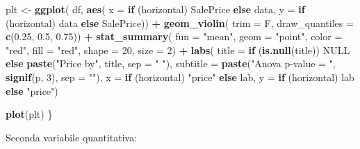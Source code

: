 \documentclass[
]{article}
\newenvironment{Shaded}{\begin{snugshade}}{\end{snugshade}}
\newcommand{\AttributeTok}[1]{\textcolor[rgb]{0.13,0.29,0.53}{#1}}
\newcommand{\ConstantTok}[1]{\textcolor[rgb]{0.56,0.35,0.01}{#1}}
\newcommand{\ControlFlowTok}[1]{\textcolor[rgb]{0.13,0.29,0.53}{\textbf{#1}}}
\newcommand{\DecValTok}[1]{\textcolor[rgb]{0.00,0.00,0.81}{#1}}
\newcommand{\FloatTok}[1]{\textcolor[rgb]{0.00,0.00,0.81}{#1}}
\newcommand{\FunctionTok}[1]{\textcolor[rgb]{0.13,0.29,0.53}{\textbf{#1}}}
\newcommand{\NormalTok}[1]{#1}
\newcommand{\OtherTok}[1]{\textcolor[rgb]{0.56,0.35,0.01}{#1}}
\newcommand{\SpecialCharTok}[1]{\textcolor[rgb]{0.81,0.36,0.00}{\textbf{#1}}}
\newcommand{\StringTok}[1]{\textcolor[rgb]{0.31,0.60,0.02}{#1}}
\begin{document}
\begin{Shaded}
\begin{Highlighting}[]
\NormalTok{    plt }\OtherTok{\textless{}{-}} \FunctionTok{ggplot}\NormalTok{(}
\NormalTok{        df,}
        \FunctionTok{aes}\NormalTok{(}
            \AttributeTok{x =} \ControlFlowTok{if}\NormalTok{ (horizontal) SalePrice }\ControlFlowTok{else}\NormalTok{ data, }
            \AttributeTok{y =} \ControlFlowTok{if}\NormalTok{ (horizontal) data }\ControlFlowTok{else}\NormalTok{ SalePrice)) }\SpecialCharTok{+}
    \FunctionTok{geom\_violin}\NormalTok{(}
        \AttributeTok{trim =}\NormalTok{ F, }
        \AttributeTok{draw\_quantiles =} \FunctionTok{c}\NormalTok{(}\FloatTok{0.25}\NormalTok{, }\FloatTok{0.5}\NormalTok{, }\FloatTok{0.75}\NormalTok{)) }\SpecialCharTok{+}
    \FunctionTok{stat\_summary}\NormalTok{(}
        \AttributeTok{fun =} \StringTok{"mean"}\NormalTok{,}
        \AttributeTok{geom =} \StringTok{"point"}\NormalTok{,}
        \AttributeTok{color =} \StringTok{"red"}\NormalTok{,}
        \AttributeTok{fill =} \StringTok{"red"}\NormalTok{,}
        \AttributeTok{shape =} \DecValTok{20}\NormalTok{,}
        \AttributeTok{size =} \DecValTok{2}\NormalTok{) }\SpecialCharTok{+}
    \FunctionTok{labs}\NormalTok{(}
        \AttributeTok{title =} \ControlFlowTok{if}\NormalTok{ (}\FunctionTok{is.null}\NormalTok{(title)) }\ConstantTok{NULL} \ControlFlowTok{else} \FunctionTok{paste}\NormalTok{(}\StringTok{"Price by"}\NormalTok{, title, }\AttributeTok{sep =} \StringTok{" "}\NormalTok{),}
        \AttributeTok{subtitle =} \FunctionTok{paste}\NormalTok{(}\StringTok{"Anova p{-}value = "}\NormalTok{, }\FunctionTok{signif}\NormalTok{(p, }\DecValTok{3}\NormalTok{), }\AttributeTok{sep =} \StringTok{""}\NormalTok{),}
        \AttributeTok{x =} \ControlFlowTok{if}\NormalTok{ (horizontal) }\StringTok{"price"} \ControlFlowTok{else}\NormalTok{ lab,}
        \AttributeTok{y =} \ControlFlowTok{if}\NormalTok{ (horizontal) lab }\ControlFlowTok{else} \StringTok{"price"}\NormalTok{)}
    
    \FunctionTok{plot}\NormalTok{(plt)}
\NormalTok{\}}
\end{Highlighting}
\end{Shaded}

Seconda variabile quantitativa:
\end{document}
